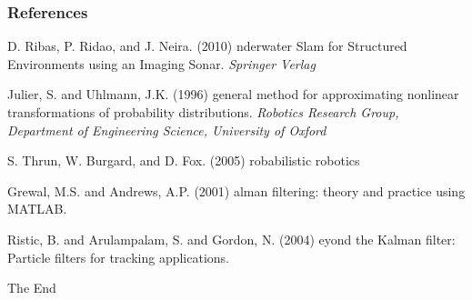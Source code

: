 \documentclass{beamer}
\begin{document}
\begin{frame}
\frametitle{References}
\footnotesize{
\begin{thebibliography}{99}


  D. Ribas, P. Ridao, and J. Neira. (2010)
 nderwater {S}lam for {S}tructured {E}nvironments using an {I}maging {S}onar. \newblock \emph{\em Springer Verlag} 
%  
 
  Julier, S. and Uhlmann, J.K. (1996)
  general method for approximating nonlinear transformations of probability distributions.
 \newblock \emph{\em Robotics Research Group, Department of Engineering Science, University of Oxford}
 
   S. Thrun, W. Burgard, and D. Fox. (2005)
 robabilistic robotics
 
  Grewal, M.S. and Andrews, A.P. (2001)
 alman filtering: theory and practice using MATLAB.
  
  Ristic, B. and Arulampalam, S. and Gordon, N. (2004)
 eyond the Kalman filter: Particle filters for tracking applications.

       
\end{thebibliography}
}
\end{frame}

\begin{frame}
\centerline{The End}
\end{frame}


\end{document}
